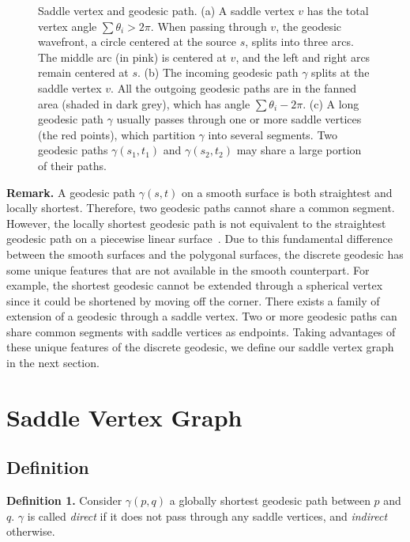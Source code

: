 \begin{figure}[htbp]
\vspace{-0.1in} \caption{Saddle vertex and geodesic path. (a) A
saddle vertex $v$ has the total vertex angle $\sum \theta_i > 2\pi$.
When passing through $v$, the geodesic wavefront, a circle centered
at the source $s$, splits into three arcs. The middle arc (in pink)
is centered at $v$, and the left and right arcs remain centered at
$s$. (b) The incoming geodesic path $\gamma$ splits at the saddle
vertex $v$. All the outgoing geodesic paths are in the fanned area
(shaded in dark grey), which has angle $\sum \theta_i - 2\pi$. (c) A
long geodesic path $\gamma$ usually passes through one or more
saddle vertices (the red points), which partition $\gamma$ into
several segments. Two geodesic paths $\gamma(s_1,t_1)$ and
$\gamma(s_2,t_2)$ may share a large portion of their paths. }
\label{fig:saddle}
\end{figure}

\vspace{-0.1in} \noindent\textbf{Remark.} A geodesic path
$\gamma(s,t)$ on a smooth surface is both straightest and locally
shortest. Therefore, two geodesic paths cannot share a common
segment. However,  the locally shortest geodesic path is not
equivalent to the straightest geodesic path on a piecewise linear
surface~\cite{Polthier_Schmies:1998}. Due to this fundamental
difference between the smooth surfaces and the polygonal surfaces,
the discrete geodesic has some unique features that are not
available in the smooth counterpart. For example, the shortest
geodesic cannot be extended through a spherical vertex since it
could be shortened by moving off the corner. There exists a family
of extension of a geodesic through a saddle vertex. Two or more
geodesic paths can share common segments with saddle vertices as
endpoints. Taking advantages of these unique features of the
discrete geodesic, we define our saddle vertex graph in the next
section.


\section{Saddle Vertex Graph}
\label{sec:svg}

\subsection{Definition}
\label{subsec:def}

\noindent\textbf{Definition 1.}  Consider $\gamma(p,q)$ a globally
shortest geodesic path between $p$ and $q$. $\gamma$ is called
\textit{direct} if it does not pass through any saddle vertices, and
\textit{indirect} otherwise.

